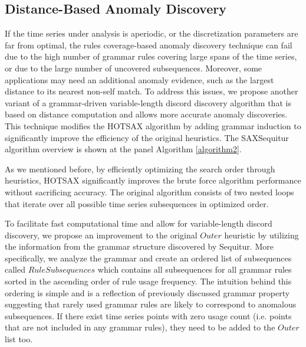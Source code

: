 \documentclass{llncs}
\begin{document}
\subsection{Distance-Based Anomaly Discovery}
If the time series under analysis is aperiodic, or the discretization parameters are far from optimal, the rules coverage-based anomaly discovery technique can fail due to the high number of grammar rules covering large spans of the time series, or due to the large number of uncovered subsequences. Moreover, some applications may need an additional anomaly evidence, such as the largest distance to its nearest non-self match. To address this issues, we propose another variant of a grammar-driven variable-length discord discovery algorithm that is based on distance computation and allows more accurate anomaly discoveries. This technique modifies the HOTSAX \cite{hot_sax} algorithm by adding grammar induction to significantly improve the efficiency of the original heuristics. The SAXSequitur algorithm overview is shown at the panel Algorithm \ref{algorithm2}.

As we mentioned before, by efficiently optimizing the search order through heuristics, HOTSAX significantly improves the brute force algorithm performance without sacrificing accuracy. The original algorithm consists of two nested loops that iterate over all possible time series subsequences in optimized order. 

To facilitate fast computational time and allow for variable-length discord discovery, we propose an improvement to the original $Outer$ heuristic by utilizing the information from the grammar structure discovered by Sequitur. More specifically, we analyze the grammar and create an ordered list of subsequences called $RuleSubsequences$ which contains all subsequences for all grammar rules sorted in the ascending order of rule usage frequency. The intuition behind this ordering is simple and is a reflection of previously discussed grammar property suggesting that rarely used grammar rules are likely to correspond to anomalous subsequences. If there exist time series points with zero usage count (i.e. points that are not included in any grammar rules), they need to be added to the $Outer$ list too. %
\end{document}
